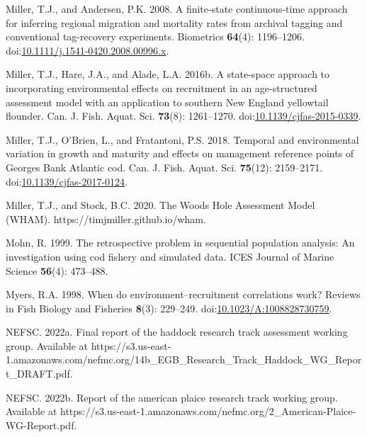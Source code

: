 \documentclass[
]{article}
\newlength{\cslhangindent}
\newlength{\cslentryspacingunit} %
\newenvironment{CSLReferences}[2] %
 {%
  \setlength{\parindent}{0pt}
  \ifodd #1
  \let\oldpar\par
  \def\par{\hangindent=\cslhangindent\oldpar}
  \fi
  \setlength{\parskip}{#2\cslentryspacingunit}
 }%
 {}
\begin{document}
\begin{CSLReferences}{1}{0}
\leavevmode{}%
Miller, T.J., and Andersen, P.K. 2008. A finite-state continuous-time
approach for inferring regional migration and mortality rates from
archival tagging and conventional tag-recovery experiments. Biometrics
\textbf{64}(4): 1196--1206.
doi:\href{https://doi.org/10.1111/j.1541-0420.2008.00996.x}{10.1111/j.1541-0420.2008.00996.x}.

\leavevmode{}%
Miller, T.J., Hare, J.A., and Alade, L.A. 2016b. A state-space approach
to incorporating environmental effects on recruitment in an
age-structured assessment model with an application to southern {New
England} yellowtail flounder. Can. J. Fish. Aquat. Sci. \textbf{73}(8):
1261--1270.
doi:\href{https://doi.org/10.1139/cjfas-2015-0339}{10.1139/cjfas-2015-0339}.

\leavevmode{}%
Miller, T.J., O'Brien, L., and Fratantoni, P.S. 2018. Temporal and
environmental variation in growth and maturity and effects on management
reference points of {Georges Bank Atlantic} cod. Can. J. Fish. Aquat.
Sci. \textbf{75}(12): 2159--2171.
doi:\href{https://doi.org/10.1139/cjfas-2017-0124}{10.1139/cjfas-2017-0124}.

\leavevmode{}%
Miller, T.J., and Stock, B.C. 2020. The {Woods Hole Assessment Model}
({WHAM}). https://timjmiller.github.io/wham.

\leavevmode{}%
Mohn, R. 1999. The retrospective problem in sequential population
analysis: An investigation using cod fishery and simulated data. ICES
Journal of Marine Science \textbf{56}(4): 473--488.

\leavevmode{}%
Myers, R.A. 1998. When do environment--recruitment correlations work?
Reviews in Fish Biology and Fisheries \textbf{8}(3): 229--249.
doi:\href{https://doi.org/10.1023/A:1008828730759}{10.1023/A:1008828730759}.

\leavevmode{}%
NEFSC. 2022a. Final report of the haddock research track assessment
working group. {Available} at
https://s3.us-east-1.amazonaws.com/nefmc.org/14b\_EGB\_Research\_Track\_Haddock\_WG\_Report\_DRAFT.pdf.

\leavevmode{}%
NEFSC. 2022b. Report of the american plaice research track working
group. {Available} at
https://s3.us-east-1.amazonaws.com/nefmc.org/2\_American-Plaice-WG-Report.pdf.


\end{CSLReferences}
\end{document}
